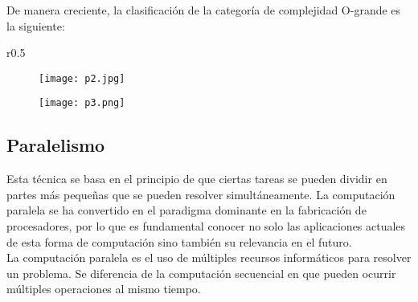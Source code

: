 \documentclass{article}
\begin{document}
De manera creciente, la clasificación de la categoría de complejidad O-grande es la siguiente:\\
\begin{wrapfigure}[0]{r}{0.5\textwidth}
\vspace{-15pt}
\end{wrapfigure}
\begin{figure}[h]
\texttt{[image: p2.jpg]}
\end{figure}

\begin{figure}[h]
\texttt{[image: p3.png]}
\end{figure}
\subsection{Paralelismo}

Esta técnica se basa en el principio de que ciertas tareas se pueden dividir en partes más pequeñas que se pueden resolver simultáneamente. La computación paralela se ha convertido en el paradigma dominante en la fabricación de procesadores, por lo que es fundamental conocer no solo las aplicaciones actuales de esta forma de computación sino también su relevancia en el futuro.\\

La computación paralela es el uso de múltiples recursos informáticos para resolver un problema. Se diferencia de la computación secuencial en que pueden ocurrir múltiples operaciones al mismo tiempo.\\
\end{document}
